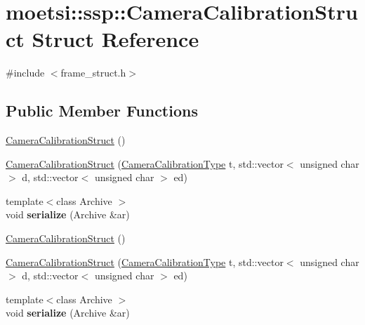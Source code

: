 \hypertarget{structmoetsi_1_1ssp_1_1CameraCalibrationStruct}{}\section{moetsi\+:\+:ssp\+:\+:Camera\+Calibration\+Struct Struct Reference}
\label{structmoetsi_1_1ssp_1_1CameraCalibrationStruct}


{\ttfamily \#include $<$frame\+\_\+struct.\+h$>$}

\subsection*{Public Member Functions}
\begin{DoxyCompactItemize}
\item 
\hyperlink{structmoetsi_1_1ssp_1_1CameraCalibrationStruct_a5571f80a7f6136c795fde444eef1d015}{Camera\+Calibration\+Struct} ()
\item 
\hyperlink{structmoetsi_1_1ssp_1_1CameraCalibrationStruct_afda542a87cb4e84eb1af89763f3d2c3c}{Camera\+Calibration\+Struct} (\hyperlink{namespacemoetsi_1_1ssp_a1f51291db51233dc5865d42e6ee36ef8}{Camera\+Calibration\+Type} t, std\+::vector$<$ unsigned char $>$ d, std\+::vector$<$ unsigned char $>$ ed)
\item 
\mbox{\label{structmoetsi_1_1ssp_1_1CameraCalibrationStruct_aec1417ffc77fb72c19a40e9b82b157b9}} 
{\footnotesize template$<$class Archive $>$ }\\void {\bfseries serialize} (Archive \&ar)
\item 
\hyperlink{structmoetsi_1_1ssp_1_1CameraCalibrationStruct_a5571f80a7f6136c795fde444eef1d015}{Camera\+Calibration\+Struct} ()
\item 
\hyperlink{structmoetsi_1_1ssp_1_1CameraCalibrationStruct_afda542a87cb4e84eb1af89763f3d2c3c}{Camera\+Calibration\+Struct} (\hyperlink{namespacemoetsi_1_1ssp_a1f51291db51233dc5865d42e6ee36ef8}{Camera\+Calibration\+Type} t, std\+::vector$<$ unsigned char $>$ d, std\+::vector$<$ unsigned char $>$ ed)
\item 
\mbox{\label{structmoetsi_1_1ssp_1_1CameraCalibrationStruct_aec1417ffc77fb72c19a40e9b82b157b9}} 
{\footnotesize template$<$class Archive $>$ }\\void {\bfseries serialize} (Archive \&ar)
\end{DoxyCompactItemize}
